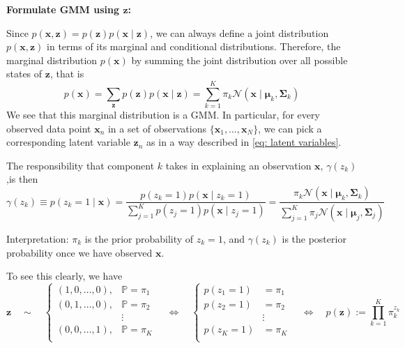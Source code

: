 \documentclass[11pt]{article}
\theoremstyle{plain} %
\newenvironment{topic}
{\color{C2}\normalfont\begin{framed}\begingroup }
  {\endgroup\end{framed}}
\theoremstyle{remark}
\newenvironment{remark}
  {\pushQED{\qed}\renewcommand{\qedsymbol}{$\triangle$}\remarkx}
  {\popQED\endremarkx}
\begin{document}
\begin{topic}
\textbf{Formulate GMM using $\mathbf{z}$:}

Since $p(\mathbf{x}, \mathbf{z})=p(\mathbf{z}) p(\mathbf{x} \mid \mathbf{z})$,
we can always define a joint distribution $p(\mathbf{x}, \mathbf{z})$ in terms
of its marginal and conditional distributions. Therefore, the marginal
distribution $p(\mathbf{x})$ by summing the joint distribution over all possible
states of $\mathbf{z}$, that is
$$
  p(\mathbf{x})=\sum_{\mathbf{z}} p(\mathbf{z}) p(\mathbf{x} \mid \mathbf{z})=\sum_{k=1}^{K} \pi_{k} \mathcal{N}\left(\mathbf{x} \mid \boldsymbol{\mu}_{k}, \boldsymbol{\Sigma}_{k}\right)
$$
We see that this marginal distribution is a GMM. In particular, for
every observed data point $\mathbf{x}_{n}$ in a set of
observations $\{\mathbf{x}_{1}, \ldots, \mathbf{x}_{N}\}$, we can pick a corresponding latent
variable $\mathbf{z}_{n}$ as in a way described in \cref{eq: latent variables}.

The responsibility that component $k$
takes in explaining an observation $\mathbf{x}$, $\gamma\left(z_{k}\right)$,is then
$$
  \gamma\left(z_{k}\right) \equiv p\left(z_{k}=1 \mid \mathbf{x}\right) =\frac{p\left(z_{k}=1\right) p\left(\mathbf{x} \mid z_{k}=1\right)}{\sum_{j=1}^{K} p\left(z_{j}=1\right) p\left(\mathbf{x} \mid z_{j}=1\right)}
  =\frac{\pi_{k} \mathcal{N}\left(\mathbf{x} \mid \boldsymbol{\mu}_{k}, \boldsymbol{\Sigma}_{k}\right)}{\sum_{j=1}^{K} \pi_{j} \mathcal{N}\left(\mathbf{x} \mid \boldsymbol{\mu}_{j}, \boldsymbol{\Sigma}_{j}\right)}
$$

Interpretation: $\pi_{k}$ is the prior probability of $z_{k}=1$, and
$\gamma\left(z_{k}\right)$ is the posterior probability once we have observed
$\mathbf{x}$.

\begin{remark}
  To see this clearly, we have
  $$
    \mathbf{z} \quad \sim \quad \begin{cases}
      (1, 0, \ldots, 0), & \mathbb{P} = \pi_{1} \\
      (0, 1, \ldots, 0), & \mathbb{P} = \pi_{2} \\
                         & \vdots               \\
      (0, 0, \ldots, 1), & \mathbb{P} = \pi_{K} \\
    \end{cases} \quad
    \Longleftrightarrow
    \quad \begin{cases}
      p\left(z_{1}=1\right) & = \pi_{1} \\
      p\left(z_{2}=1\right) & = \pi_{2} \\
                            & \vdots    \\
      p\left(z_{K}=1\right) & = \pi_{K} \\
    \end{cases}\quad
    \Longleftrightarrow
    \quad
    p(\mathbf{z}):=\prod_{k=1}^{K} \pi_{k}^{z_{k}}
  $$
\end{remark}
\end{topic}
\end{document}
